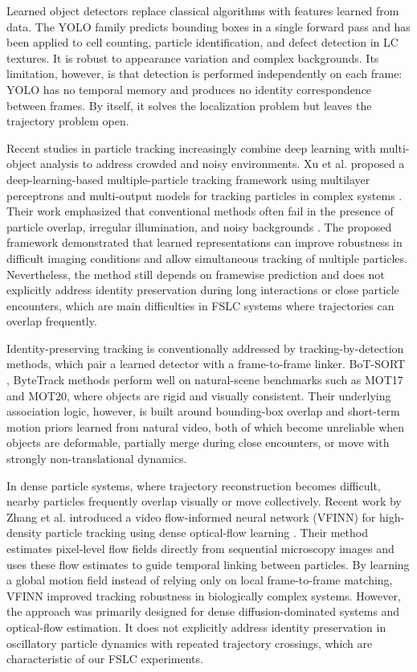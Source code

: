 \documentclass[conference]{IEEEtran}
\begin{document}
Learned object detectors replace classical algorithms with features learned from data. The YOLO family \cite{vijayakumar2024_yolo_review} predicts bounding boxes in a single forward pass and has been applied to cell counting, particle identification, and defect detection in LC textures. It is robust to appearance variation and complex backgrounds. Its limitation, however, is that detection is performed independently on each frame: YOLO has no temporal memory and produces no identity correspondence between frames. By itself, it solves the localization problem but leaves the trajectory problem open.

Recent studies in particle tracking increasingly combine deep learning with multi-object analysis to address crowded and noisy environments. Xu et al. proposed a deep-learning-based multiple-particle tracking framework using multilayer perceptrons and multi-output models for tracking particles in complex systems \cite{xu2024_dl_multiple_particle_tracking}. Their work emphasized that conventional methods often fail in the presence of particle overlap, irregular illumination, and noisy backgrounds \cite{xu2024_dl_multiple_particle_tracking}. The proposed framework demonstrated that learned representations can improve robustness in difficult imaging conditions and allow simultaneous tracking of multiple particles. Nevertheless, the method still depends on framewise prediction and does not explicitly address identity preservation during long interactions or close particle encounters, which are main difficulties in FSLC systems where trajectories can overlap frequently.

Identity-preserving tracking is conventionally addressed by tracking-by-detection methods, which pair a learned detector with a frame-to-frame linker. BoT-SORT \cite{aharon2022_botsort}, ByteTrack \cite{sheng2023_yolov7_bytetrack} methods perform well on natural-scene benchmarks such as MOT17 and MOT20, where objects are rigid and visually consistent. Their underlying association logic, however, is built around bounding-box overlap and short-term motion priors learned from natural video, both of which become unreliable when objects are deformable, partially merge during close encounters, or move with strongly non-translational dynamics.

In dense particle systems, where trajectory reconstruction becomes difficult, nearby particles frequently overlap visually or move collectively. Recent work by Zhang et al. introduced a video flow-informed neural network (VFINN) for high-density particle tracking using dense optical-flow learning \cite{zhang2025largevisionmodeltracking}. Their method estimates pixel-level flow fields directly from sequential microscopy images and uses these flow estimates to guide temporal linking between particles. By learning a global motion field instead of relying only on local frame-to-frame matching, VFINN improved tracking robustness in biologically complex systems. However, the approach was primarily designed for dense diffusion-dominated systems and optical-flow estimation. It does not explicitly address identity preservation in oscillatory particle dynamics with repeated trajectory crossings, which are characteristic of our FSLC experiments.
\end{document}
